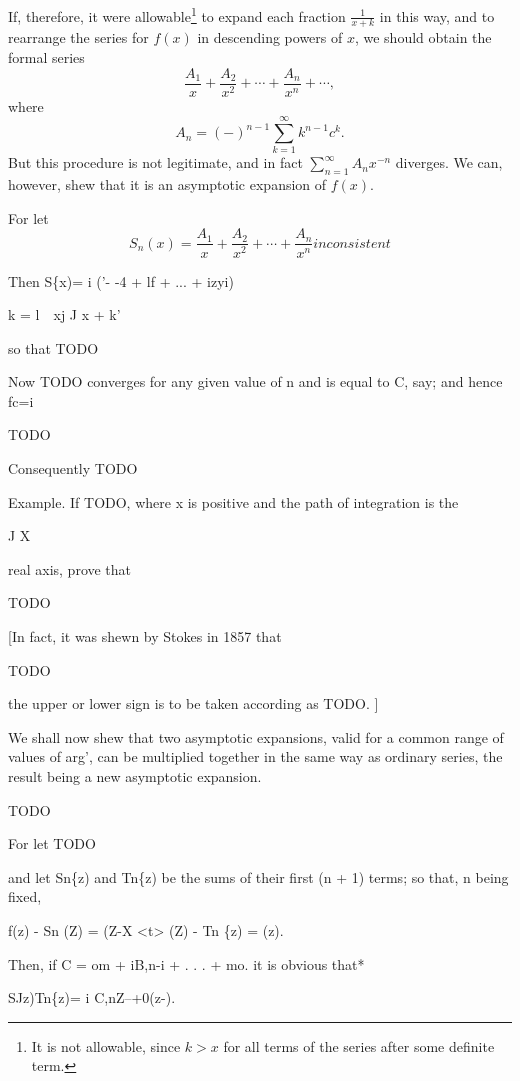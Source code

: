 If, therefore, it were allowable\footnote{It is not allowable, since
$k>x$ for all terms of the series after some definite term.} to expand
each fraction $\frac{1}{x+k}$ in this way, and to rearrange the series
for $f(x)$ in descending powers of $x$, we should obtain the formal
series
$$
\frac{A_{1}}{x} + \frac{A_{2}}{x^{2}} + \cdots + \frac{A_{n}}{x^{n}} +
\cdots,
$$
where
$$
A_{n} = (-)^{n-1} \sum_{k=1}^{\infty} k^{n-1} c^{k}.
$$
But this procedure is not legitimate, and in fact $\sum_{n=1}^{\infty}
A_{n} x^{-n}$ diverges. We can, however, shew that it is an asymptotic
expansion of $f(x)$.

For let
$$
S_{n}(x) = \frac{A_{1}}{x} + \frac{A_{2}}{x^{2}} + \cdots +
\frac{A_{n}}{x^{n}} %
inconsistent
$$

Then S\{x)= i ('- -4 + lf + ... + izyi)

k = l\ \ xj J x + k'

so that TODO

Now TODO converges for any given value of n and is equal to C, say;
and hence fc=i

TODO

Consequently TODO

Example. If TODO, where x is positive and the path of integration is
the

J X

real axis, prove that

TODO

[In fact, it was shewn by Stokes in 1857 that

TODO

the upper or lower sign is to be taken according as TODO. ]

We shall now shew that two asymptotic expansions, valid for a common
range of values of arg', can be multiplied together in the same way
as ordinary series, the result being a new asymptotic expansion.

TODO

For let TODO

%
%
and let Sn\{z) and Tn\{z) be the sums of their first (n + 1) terms; so
that, n being fixed,

f(z) - Sn (Z) = (Z-X <t> (Z) - Tn \{z) = (z).

Then, if C = om + iB,n-i + . . . + mo. it is obvious that*

SJz)Tn\{z)= i C,nZ--+0(z-).


